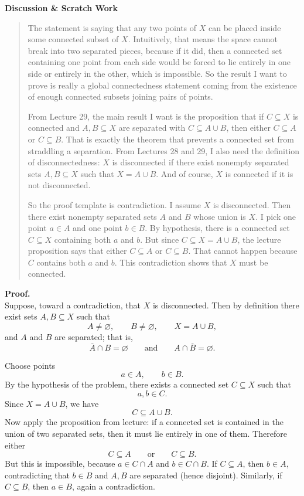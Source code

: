 \documentclass[12pt]{article}
\newenvironment{scratch}{%
  \par\smallskip
  \noindent\textbf{Discussion \& Scratch Work}\begin{quote}\small
}{%
  \end{quote}\smallskip
}
\begin{document}
\begin{scratch}
The statement is saying that any two points of $X$ can be placed inside some connected subset of $X$. Intuitively, that means the space cannot break into two separated pieces, because if it did, then a connected set containing one point from each side would be forced to lie entirely in one side or entirely in the other, which is impossible. So the result I want to prove is really a global connectedness statement coming from the existence of enough connected subsets joining pairs of points.

From Lecture 29, the main result I want is the proposition that if $C\subseteq X$ is connected and $A,B\subseteq X$ are separated with $C\subseteq A\cup B$, then either $C\subseteq A$ or $C\subseteq B$. That is exactly the theorem that prevents a connected set from straddling a separation. From Lectures 28 and 29, I also need the definition of disconnectedness: $X$ is disconnected if there exist nonempty separated sets $A,B\subseteq X$ such that $X=A\cup B$. And of course, $X$ is connected if it is not disconnected.

So the proof template is contradiction. I assume $X$ is disconnected. Then there exist nonempty separated sets $A$ and $B$ whose union is $X$. I pick one point $a\in A$ and one point $b\in B$. By hypothesis, there is a connected set $C\subseteq X$ containing both $a$ and $b$. But since $C\subseteq X=A\cup B$, the lecture proposition says that either $C\subseteq A$ or $C\subseteq B$. That cannot happen because $C$ contains both $a$ and $b$. This contradiction shows that $X$ must be connected.
\end{scratch}

\textbf{Proof.}\\
Suppose, toward a contradiction, that $X$ is disconnected. Then by definition there exist sets $A,B\subseteq X$ such that
\[
A\neq\varnothing,
\qquad
B\neq\varnothing,
\qquad
X=A\cup B,
\]
and $A$ and $B$ are separated; that is,
\[
\overline{A}\cap B=\varnothing
\qquad\text{and}\qquad
A\cap\overline{B}=\varnothing.
\]

Choose points
\[
a\in A,
\qquad
b\in B.
\]
By the hypothesis of the problem, there exists a connected set $C\subseteq X$ such that
\[
a,b\in C.
\]
Since $X=A\cup B$, we have
\[
C\subseteq A\cup B.
\]
Now apply the proposition from lecture: if a connected set is contained in the union of two separated sets, then it must lie entirely in one of them. Therefore either
\[
C\subseteq A
\qquad\text{or}\qquad
C\subseteq B.
\]
But this is impossible, because $a\in C\cap A$ and $b\in C\cap B$. If $C\subseteq A$, then $b\in A$, contradicting that $b\in B$ and $A,B$ are separated (hence disjoint). Similarly, if $C\subseteq B$, then $a\in B$, again a contradiction.
\end{document}
